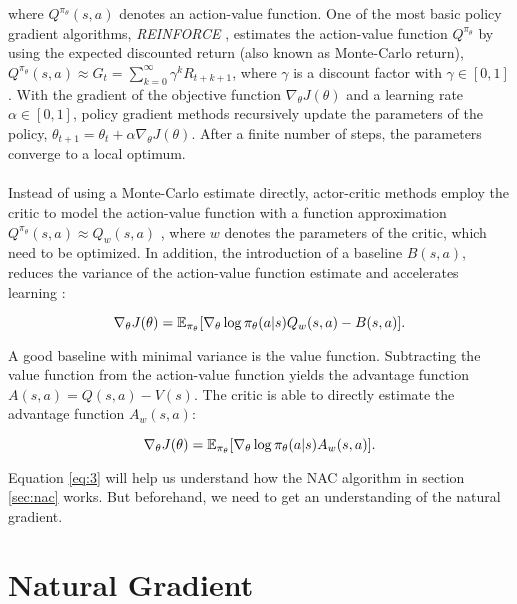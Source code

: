 where $Q^{\pi_{\theta}}(s, a)$ denotes an action-value function. One of the most basic policy gradient algorithms, \textit{REINFORCE} \citep{williams1992simple}, estimates the action-value function $Q^{\pi_{\theta}}$ by using the expected discounted return (also known as Monte-Carlo return), \(Q^{\pi_\theta}(s, a) \approx \mathit{G}_t = \sum_{k=0}^{\infty}\gamma^k R_{t+k+1}\),
where $\gamma$ is a discount factor with $\gamma \in [0, 1]$. With the gradient of the objective function $\nabla_{\theta}J(\theta)$ and a learning rate $\alpha \in \left[0,1\right]$, policy gradient methods recursively update the parameters of the policy, $\theta_{t+1} = \theta_t + \alpha \nabla_{\theta} J(\theta)$. After a finite number of steps, the parameters converge to a local optimum. 
\\\\
Instead of using a Monte-Carlo estimate directly, actor-critic methods employ the critic to model the action-value function with a function approximation $Q^{\pi_\theta}(s, a) \approx Q_w(s,a)$ \citep{sutton2000policy}, where $w$ denotes the parameters of the critic, which need to be optimized. In addition, the introduction of a baseline $B(s,a)$, reduces the variance of the action-value function estimate and accelerates learning \citep{sutton2018reinforcement}:

\begin{equation}
\label{equ:policybaseline}
\nabla_{\theta}J(\theta)=\operatorname{\mathbb{E}}_{\pi_{\theta}}[\nabla_{\theta}\log\pi_{\theta}(a|s) Q_w(s, a) - B(s,a)].
\end{equation}

A good baseline with minimal variance is the value function. Subtracting the value function from the action-value function yields the advantage function $A(s,a) = Q(s,a)-V(s)$. The critic is able to directly estimate the advantage function $A_w(s,a)$:

\begin{equation}
	\label{eq:3}
	\nabla_{\theta}J(\theta)=\operatorname{\mathbb{E}}_{\pi_{\theta}}[\nabla_{\theta}\log\pi_{\theta}(a|s) A_w(s, a)].
\end{equation}

Equation \ref{eq:3} will help us understand how the NAC algorithm in section \ref{sec:nac} works. But beforehand, we need to get an understanding of the natural gradient.

\section{Natural Gradient}
\label{sec:NG}

